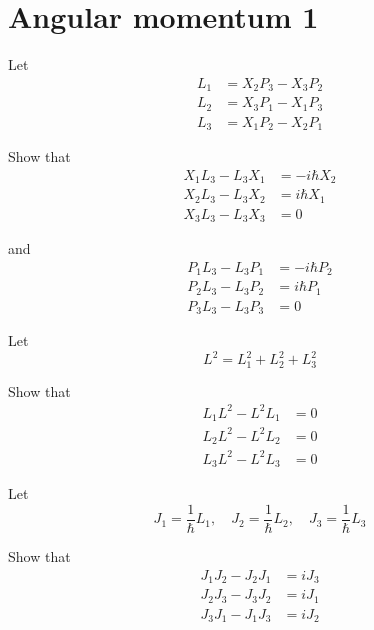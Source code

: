 

\section*{Angular momentum 1}

Let
\begin{align*}
L_1&=X_2P_3-X_3P_2
\\
L_2&=X_3P_1-X_1P_3
\\
L_3&=X_1P_2-X_2P_1
\end{align*}

Show that
\begin{align*}
X_1L_3-L_3X_1&=-i\hbar X_2
\\
X_2L_3-L_3X_2&=i\hbar X_1
\\
X_3L_3-L_3X_3&=0
\end{align*}

and
\begin{align*}
P_1L_3-L_3P_1&=-i\hbar P_2
\\
P_2L_3-L_3P_2&=i\hbar P_1
\\
P_3L_3-L_3P_3&=0
\end{align*}

Let
\begin{equation*}
L^2=L_1^2+L_2^2+L_3^2
\end{equation*}

Show that
\begin{align*}
L_1L^2-L^2L_1&=0
\\
L_2L^2-L^2L_2&=0
\\
L_3L^2-L^2L_3&=0
\end{align*}

Let
\begin{equation*}
J_1=\frac{1}{\hbar}L_1,\quad J_2=\frac{1}{\hbar}L_2,\quad J_3=\frac{1}{\hbar}L_3
\end{equation*}

Show that
\begin{align*}
J_1J_2-J_2J_1&=iJ_3
\\
J_2J_3-J_3J_2&=iJ_1
\\
J_3J_1-J_1J_3&=iJ_2
\end{align*}


